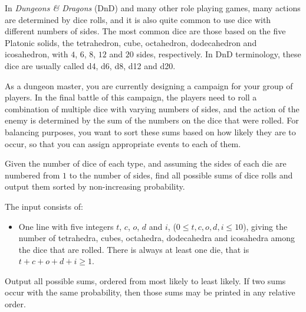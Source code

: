 %
In \emph{Dungeons \& Dragons} (DnD) and many other role playing games, many
actions are determined by dice rolls, and it is also quite common to use dice
with different numbers of sides. The most common dice are those based on the
five Platonic solids, the tetrahedron, cube, octahedron, dodecahedron and
icosahedron, with $4$, $6$, $8$, $12$ and $20$ sides, respectively. In DnD
terminology, these dice are usually called d4, d6, d8, d12 and d20.

As a dungeon master, you are currently designing a campaign for your group of
players. In the final battle of this campaign, the players need to roll a
combination of multiple dice with varying numbers of sides, and the action of
the enemy is determined by the sum of the numbers on the dice that were rolled.
For balancing purposes, you want to sort these sums based on how likely they
are to occur, so that you can assign appropriate events to each of them.

Given the number of dice of each type, and assuming the sides of each die are
numbered from $1$ to the number of sides, find all possible sums of dice rolls
and output them sorted by non-increasing probability.

\begin{Input}
  The input consists of:
  \begin{itemize}
    \item One line with five integers $t$, $c$, $o$, $d$ and $i$, ($0 \le t, c,
      o, d, i \le 10$), giving the number of tetrahedra, cubes, octahedra,
      dodecahedra and icosahedra among the dice that are rolled. There is
      always at least one die, that is $t+c+o+d+i \ge 1$.
  \end{itemize}
\end{Input}

\begin{Output}
  Output all possible sums, ordered from most likely to least likely. If two
  sums occur with the same probability, then those sums may be printed in any
  relative order.
\end{Output}
